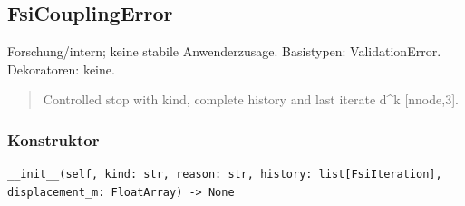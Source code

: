 \subsection{FsiCouplingError}
Forschung/intern; keine stabile Anwenderzusage.
Basistypen: ValidationError. Dekoratoren: keine.
\begin{quote}
Controlled stop with kind, complete history and last iterate d\textasciicircum{}k [nnode,3].
\end{quote}
\subsubsection*{Konstruktor}
\begin{lstlisting}
__init__(self, kind: str, reason: str, history: list[FsiIteration], displacement_m: FloatArray) -> None
\end{lstlisting}
